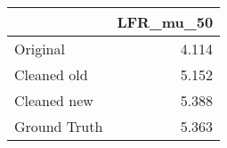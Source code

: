 \begin{tabular}{lr}
\toprule
{} & LFR_mu_50 \\
\midrule
Original     &     4.114 \\
Cleaned old  &     5.152 \\
Cleaned new  &     5.388 \\
Ground Truth &     5.363 \\
\bottomrule
\end{tabular}
